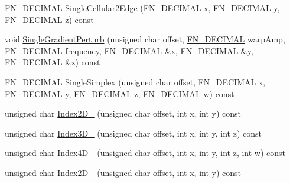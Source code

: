 \begin{DoxyCompactItemize}
\item 
\mbox{\hyperlink{_fast_noise_8h_a75a9ef6d2541c4921815b885bfd449c3}{F\+N\+\_\+\+D\+E\+C\+I\+M\+AL}} \mbox{\hyperlink{class_fast_noise_a10e1d5c203e0d93b70f9f3aa4718e221}{Single\+Cellular2\+Edge}} (\mbox{\hyperlink{_fast_noise_8h_a75a9ef6d2541c4921815b885bfd449c3}{F\+N\+\_\+\+D\+E\+C\+I\+M\+AL}} x, \mbox{\hyperlink{_fast_noise_8h_a75a9ef6d2541c4921815b885bfd449c3}{F\+N\+\_\+\+D\+E\+C\+I\+M\+AL}} y, \mbox{\hyperlink{_fast_noise_8h_a75a9ef6d2541c4921815b885bfd449c3}{F\+N\+\_\+\+D\+E\+C\+I\+M\+AL}} z) const
\item 
void \mbox{\hyperlink{class_fast_noise_ac584dcaa35fdc6d8af986eba0d3ed50e}{Single\+Gradient\+Perturb}} (unsigned char offset, \mbox{\hyperlink{_fast_noise_8h_a75a9ef6d2541c4921815b885bfd449c3}{F\+N\+\_\+\+D\+E\+C\+I\+M\+AL}} warp\+Amp, \mbox{\hyperlink{_fast_noise_8h_a75a9ef6d2541c4921815b885bfd449c3}{F\+N\+\_\+\+D\+E\+C\+I\+M\+AL}} frequency, \mbox{\hyperlink{_fast_noise_8h_a75a9ef6d2541c4921815b885bfd449c3}{F\+N\+\_\+\+D\+E\+C\+I\+M\+AL}} \&x, \mbox{\hyperlink{_fast_noise_8h_a75a9ef6d2541c4921815b885bfd449c3}{F\+N\+\_\+\+D\+E\+C\+I\+M\+AL}} \&y, \mbox{\hyperlink{_fast_noise_8h_a75a9ef6d2541c4921815b885bfd449c3}{F\+N\+\_\+\+D\+E\+C\+I\+M\+AL}} \&z) const
\item 
\mbox{\hyperlink{_fast_noise_8h_a75a9ef6d2541c4921815b885bfd449c3}{F\+N\+\_\+\+D\+E\+C\+I\+M\+AL}} \mbox{\hyperlink{class_fast_noise_a1f05efc093f8c7998014dfc3b77e0753}{Single\+Simplex}} (unsigned char offset, \mbox{\hyperlink{_fast_noise_8h_a75a9ef6d2541c4921815b885bfd449c3}{F\+N\+\_\+\+D\+E\+C\+I\+M\+AL}} x, \mbox{\hyperlink{_fast_noise_8h_a75a9ef6d2541c4921815b885bfd449c3}{F\+N\+\_\+\+D\+E\+C\+I\+M\+AL}} y, \mbox{\hyperlink{_fast_noise_8h_a75a9ef6d2541c4921815b885bfd449c3}{F\+N\+\_\+\+D\+E\+C\+I\+M\+AL}} z, \mbox{\hyperlink{_fast_noise_8h_a75a9ef6d2541c4921815b885bfd449c3}{F\+N\+\_\+\+D\+E\+C\+I\+M\+AL}} w) const
\item 
unsigned char \mbox{\hyperlink{class_fast_noise_aa4cae648a6a3817d77dcd7439f711827}{Index2\+D\+\_}} (unsigned char offset, int x, int y) const
\item 
unsigned char \mbox{\hyperlink{class_fast_noise_ab4304e7e7b79684b371492d3c7f0aa51}{Index3\+D\+\_}} (unsigned char offset, int x, int y, int z) const
\item 
unsigned char \mbox{\hyperlink{class_fast_noise_a00c08735b1ca018af621a1297964a547}{Index4\+D\+\_}} (unsigned char offset, int x, int y, int z, int w) const
\item 
unsigned char \mbox{\hyperlink{class_fast_noise_aec59eb9f9bcdb06e6a7dbe5a3fdf7145}{Index2\+D\+\_}} (unsigned char offset, int x, int y) const

\end{DoxyCompactItemize}
